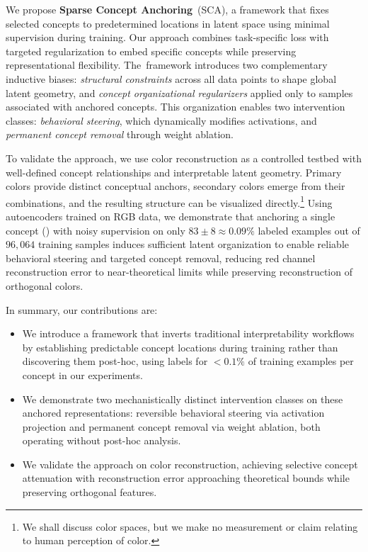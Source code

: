 We propose \textbf{Sparse Concept Anchoring}~(SCA), a framework that fixes selected concepts to predetermined locations in latent space using minimal supervision during training. Our approach combines task-specific loss with targeted regularization to embed specific concepts while preserving representational flexibility. The~framework introduces two complementary inductive biases: \textit{structural constraints} across all data points to shape global latent geometry, and \textit{concept organizational regularizers} applied only to samples associated with anchored concepts. This organization enables two intervention classes: \textit{behavioral steering}, which dynamically modifies activations, and \textit{permanent concept removal} through weight ablation.

To validate the approach, we use color reconstruction as a controlled testbed with well-defined concept relationships and interpretable latent geometry. Primary colors provide distinct conceptual anchors, secondary colors emerge from their combinations, and the resulting structure can be visualized directly.\footnote{We shall discuss color spaces, but we make no measurement or claim relating to human perception of color.} Using autoencoders trained on RGB data, we demonstrate that anchoring a single concept () with noisy supervision on only $83 \pm 8 \approx 0.09\%$ labeled examples out of $96{,}064$ training samples induces sufficient latent organization to enable reliable behavioral steering and targeted concept removal, reducing red channel reconstruction error to near-theoretical limits while preserving reconstruction of orthogonal colors.

In summary, our contributions are:
\begin{itemize}
    \item We introduce a framework that inverts traditional interpretability workflows by establishing predictable concept locations during training rather than discovering them post-hoc, using labels for $<0.1\%$ of training examples per concept in our experiments.
    \item We demonstrate two mechanistically distinct intervention classes on these anchored representations: reversible behavioral steering via activation projection and permanent concept removal via weight ablation, both operating without post-hoc analysis.
    \item We validate the approach on color reconstruction, achieving selective concept attenuation with reconstruction error approaching theoretical bounds while preserving orthogonal features.
\end{itemize}
